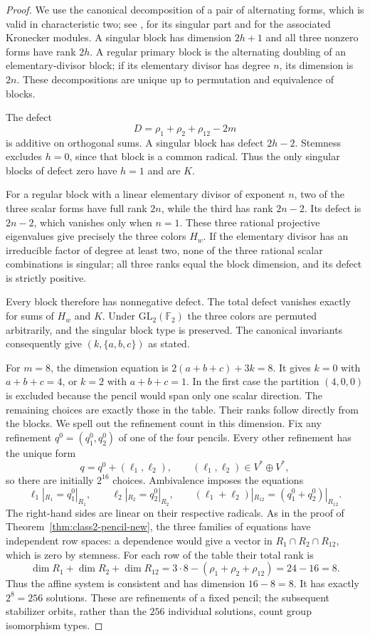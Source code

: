 \documentclass[11pt,a4paper]{amsart}
\theoremstyle{definition}
\theoremstyle{remark}
\numberwithin{equation}{section}
\begin{document}
\begin{proof}
We use the canonical decomposition of a pair of alternating forms,
which is valid in characteristic two; see \cite{Scharlau76}, \cite[Theorem~4.1]{DD18}
for its singular part and \cite[pp.~57--59]{FV04} for the associated
Kronecker modules. A singular block has dimension $2h+1$ and all
three nonzero forms have rank $2h$. A regular primary block is the
alternating doubling of an elementary-divisor block; if its elementary
divisor has degree $n$, its dimension is $2n$. These decompositions
are unique up to permutation and equivalence of blocks.

The defect
\[
 D=\rho_1+\rho_2+\rho_{12}-2m
\]
is additive on orthogonal sums. A singular block has defect $2h-2$.
Stemness excludes $h=0$, since that block is a common radical.
Thus the only singular blocks of defect zero have $h=1$ and are $K$.

For a regular block with a linear elementary divisor of exponent
$n$, two of the three scalar forms have full rank $2n$, while the
third has rank $2n-2$. Its defect is $2n-2$, which vanishes only
when $n=1$. These three rational projective eigenvalues give
precisely the three colors $H_w$. If the elementary divisor has an
irreducible factor of degree at least two, none of the three
rational scalar combinations is singular; all three ranks equal
the block dimension, and its defect is strictly positive.

Every block therefore has nonnegative defect. The total defect
vanishes exactly for sums of $H_w$ and $K$. Under
$\mathrm{GL}_2(\mathbb F_2)$ the three colors are permuted
arbitrarily, and the singular block type is preserved. The canonical
invariants consequently give $(k,\{a,b,c\})$ as stated.

For $m=8$, the dimension equation is
$2(a+b+c)+3k=8$. It gives $k=0$ with $a+b+c=4$, or $k=2$ with
$a+b+c=1$. In the first case the partition $(4,0,0)$ is excluded
because the pencil would span only one scalar direction. The
remaining choices are exactly those in the table. Their ranks follow directly from the blocks. We spell out the
refinement count in this dimension. Fix any refinement
$q^0=(q_1^0,q_2^0)$ of one of the four pencils. Every other
refinement has the unique form
\[
 q=q^0+(\ell_1,\ell_2),\qquad
 (\ell_1,\ell_2)\in V^*\oplus V^*,
\]
so there are initially $2^{16}$ choices. Ambivalence imposes the
equations
\[
 \ell_1|_{R_1}=q_1^0|_{R_1},\qquad
 \ell_2|_{R_2}=q_2^0|_{R_2},\qquad
 (\ell_1+\ell_2)|_{R_{12}}=(q_1^0+q_2^0)|_{R_{12}}.
\]
The right-hand sides are linear on their respective radicals.
As in the proof of Theorem~\ref{thm:class2-pencil-new}, the three
families of equations have independent row spaces: a dependence
would give a vector in $R_1\cap R_2\cap R_{12}$, which is zero by
stemness. For each row of the table their total rank is
\[
 \dim R_1+\dim R_2+\dim R_{12}
 =3\cdot8-(\rho_1+\rho_2+\rho_{12})=24-16=8.
\]
Thus the affine system is consistent and has dimension $16-8=8$.
It has exactly $2^8=256$ solutions. These are refinements of a fixed
pencil; the subsequent stabilizer orbits, rather than the $256$
individual solutions, count group isomorphism types.
\end{proof}
\end{document}
